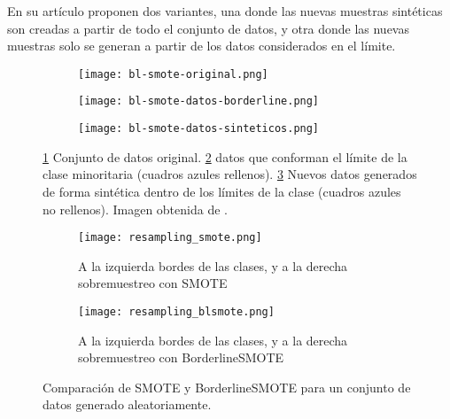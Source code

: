 En su artículo proponen dos variantes, una donde las nuevas muestras sintéticas son creadas a partir de todo el conjunto de datos, y otra donde las nuevas muestras solo se generan a partir de los datos considerados en el límite.


\begin{figure}[H]
    \centering
    \begin{subfigure}[b]{0.33\textwidth}
		  \texttt{[image: bl-smote-original.png]}
        \caption{}
        \label{fig:blSMOTE-orig}
    \end{subfigure}
    \begin{subfigure}[b]{0.33\textwidth}
        \texttt{[image: bl-smote-datos-borderline.png]}
        \caption{}
        \label{fig:blSMOTE-border}
    \end{subfigure}
    \begin{subfigure}[b]{0.33\textwidth}
        \texttt{[image: bl-smote-datos-sinteticos.png]}
        \caption{}
        \label{fig:blSMOTE-sintetico}
    \end{subfigure}

    \caption{\ref{fig:blSMOTE-orig} Conjunto de datos original. \ref{fig:blSMOTE-border} datos que conforman el límite de la clase minoritaria (cuadros azules rellenos). \ref{fig:blSMOTE-sintetico} Nuevos datos generados de forma sintética dentro de los límites de la clase (cuadros azules no rellenos). Imagen obtenida de \cite{BL-SMOTE}.}
	 \label{fig:ejemploBL-SMOTE}

\end{figure}


\begin{figure}[H]
    \centering
	 \begin{subfigure}[b]{\textwidth}
		 \centering
		 \texttt{[image: resampling\_smote.png]}
		 \caption{A la izquierda bordes de las clases, y a la derecha sobremuestreo con SMOTE}
		 \label{fig:SMOTE-cmp}
	 \end{subfigure}

    \begin{subfigure}[b]{\textwidth}
		 \centering
		  \texttt{[image: resampling\_blsmote.png]}
        \caption{A la izquierda bordes de las clases, y a la derecha sobremuestreo con BorderlineSMOTE}
        \label{fig:BLSMOTE-cmp}
    \end{subfigure}

    \caption{Comparación de SMOTE y BorderlineSMOTE para un conjunto de datos generado aleatoriamente.}\label{fig:BLSMOTE-SMOTE}

\end{figure}

